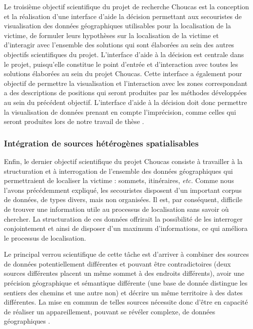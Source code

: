 Le troisième objectif scientifique du projet de recherche Choucas est
la conception et la réalisation d'une interface d'aide la décision
permettant aux secouristes de visualisation des données géographiques
utilisables pour la localisation de la victime, de formuler leurs
hypothèses sur la localisation de la victime et d’interagir avec
l'ensemble des solutions qui sont élaborées au sein des autres
objectifs scientifiques du projet. L'interface d'aide à la décision
est centrale dans le projet, puisqu'elle constitue le point d'entrée
et d'interaction avec toutes les solutions élaborées au sein du projet
Choucas. Cette interface a également pour objectif de permettre la
visualisation et l'interaction avec les zones correspondant a des
descriptions de positions qui seront produites par les méthodes
développées au sein du précédent objectif. L'interface d'aide à la
décision doit donc permettre la visualisation de données prenant en
compte l'imprécision, comme celles qui seront produites lors de notre
travail de thèse \autocite{Viry2019a}.

\subsubsection{Intégration de sources hétérogènes spatialisables}
\label{subsec:1-2-3-4}

Enfin, le dernier objectif scientifique du projet Choucas consiste à
travailler à la structuration et à interrogation de l'ensemble des
données géographiques qui permettraient de localiser la victime :
sommets, itinéraires, \emph{etc.} Comme nous l'avons précédemment
expliqué, les secouristes disposent d'un important corpus de données,
de types divers, mais non organisées. Il est, par conséquent,
difficile de trouver une information utile au processus de
localisation sans savoir où chercher. La structuration de ces données
offrirait la possibilité de les interroger conjointement et ainsi de
disposer d'un maximum d'informations, ce qui améliora le processus de
localisation.

Le principal verrou scientifique de cette tâche est d'arriver à
combiner des sources de données potentiellement différentes et pouvant
être contradictoires (\eg deux sources différentes placent un même
sommet à des endroits différents), avoir une précision géographique et
sémantique différente (\eg une base de donnée distingue les sentiers
des chemins et une autre non) et décrire un même territoire à des
dates différentes. La mise en commun de telles sources nécessite donc
d'être en capacité de réaliser un appareillement, pouvant se révéler
complexe, de données géographiques
\autocite{VanDamme2019,Halilali2018}.

